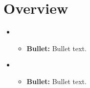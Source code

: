 \section{Overview}
\medskip
\begin{itemize}

    \item {}
    \begin{itemize}
    \item \textbf{Bullet:} Bullet text.
    \end{itemize}

    \item {}
    \begin{itemize}
    \item \textbf{Bullet:} Bullet text.
    \end{itemize}

\end{itemize}



